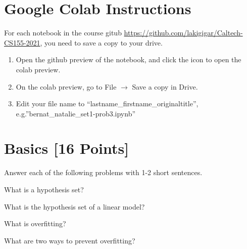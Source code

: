 \section*{Google Colab Instructions}

For each notebook in the course gitub \url{https://github.com/lakigigar/Caltech-CS155-2021}, you need to save a copy to your drive.

\begin{enumerate}
	\item Open the github preview of the notebook, and click the icon to open the colab preview.
	\item On the colab preview, go to File $\rightarrow$ Save a copy in Drive.
	\item Edit your file name to “lastname_firstname_originaltitle”, e.g.”bernat_natalie_set1-prob3.ipynb”
\end{enumerate}


\newpage
\section{Basics [16 Points]}

Answer each of the following problems with 1-2 short sentences.

\begin{problem}[2]
  What is a hypothesis set?
\end{problem}
\begin{solution}
  
\end{solution}

\begin{problem}[2]
  What is the hypothesis set of a linear model?
\end{problem}
\begin{solution}
  
\end{solution}

\begin{problem}[2]
  What is overfitting?
\end{problem}
\begin{solution}
  
\end{solution}

\begin{problem}[2]
  What are two ways to prevent overfitting?
\end{problem}
\begin{solution}
  
\end{solution}

